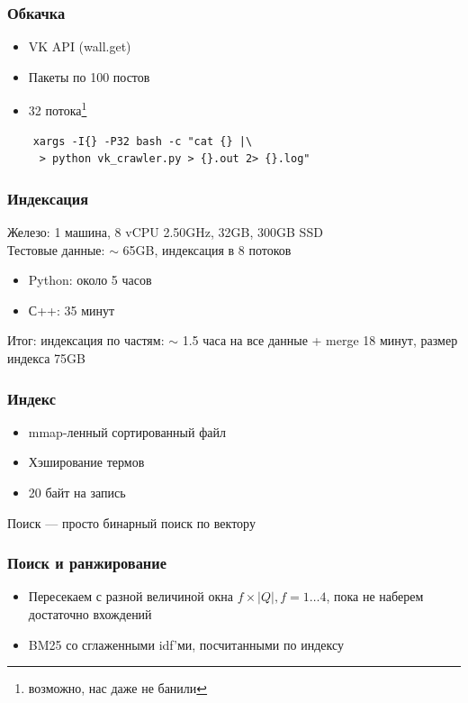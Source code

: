 \documentclass{beamer}
\begin{document}
\begin{frame}[fragile]
  \frametitle{Обкачка}
    \begin{itemize}
      \item VK API (wall.get)
      \item Пакеты по 100 постов
      \item 32 потока\footnote{возможно, нас даже не банили}
    \end{itemize}

  \begin{verbatim}
    xargs -I{} -P32 bash -c "cat {} |\
     > python vk_crawler.py > {}.out 2> {}.log"
  \end{verbatim}

\end{frame}

\begin{frame}
  \frametitle{Индексация}
    Железо: 1 машина, 8 vCPU 2.50GHz, 32GB, 300GB SSD \\
    Тестовые данные: $\sim$ 65GB, индексация в 8 потоков
    \begin{itemize}
      \item Python: около 5 часов
      \item С++: 35 минут
    \end{itemize}
    Итог: индексация по частям: $\sim$ 1.5 часа на все данные + merge 18 минут,
      размер индекса 75GB
\end{frame}

\begin{frame}
  \frametitle{Индекс}
    \begin{itemize}
      \item mmap-ленный сортированный файл
      \item Хэширование термов
      \item 20 байт на запись
    \end{itemize}

    Поиск --- просто бинарный поиск по вектору
\end{frame}

\begin{frame}
  \frametitle{Поиск и ранжирование}
  \begin{itemize}
    \item Пересекаем с разной величиной окна $f\times |Q|, f = 1\dots4$,
      пока не наберем достаточно вхождений
    \item BM25 со сглаженными idf'ми, посчитанными по индексу
  \end{itemize}
\end{frame}
\end{document}
